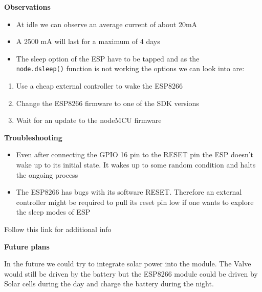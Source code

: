 \documentclass[16pt]{article}
\begin{document}
{\Large{\textbf{Observations}}}

\begin{itemize}

\item
  At idle we can observe an average current of about 20mA
\item
  A 2500 mA will last for a maximum of 4 days
\item
  The sleep option of the ESP have to be tapped and as the \\
  \texttt{node.dsleep()} function is not working the options we can look
  into are:
\end{itemize}

\begin{enumerate}

\item
  Use a cheap external controller to wake the ESP8266
\item
  Change the ESP8266 firmware to one of the SDK versions
\item
  Wait for an update to the nodeMCU firmware
\end{enumerate}

\vspace{0.5cm}
\textbf{Troubleshooting}

\begin{itemize}
\item
  Even after connecting the GPIO 16 pin to the RESET pin the ESP doesn't
  wake up to its initial state. It wakes up to some random condition and
  halts the ongoing process
\item
  The ESP8266 has bugs with its software RESET. Therefore an external
  controller might be required to pull its reset pin low if one wants to
  explore the sleep modes of ESP
\end{itemize}

Follow this link for additional info

\vspace{0.5cm}
{\Large{\textbf{Future plans}}}

\vspace{0.3cm}
In the future we could try to integrate solar power into the module. The
Valve would still be driven by the battery but the ESP8266 module could
be driven by Solar cells during the day and charge the battery during
the night.

\vspace{0.3cm}
\end{document}
